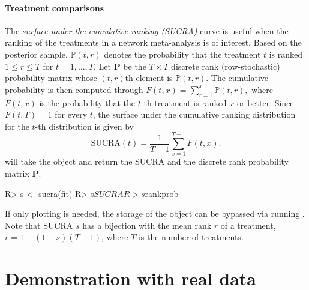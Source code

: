 \paragraph{Treatment comparisons}\label{subsec:treatment-comp} The \emph{surface under the cumulative ranking (SUCRA)} curve is useful when the ranking of the treatments in a network meta-analysis is of interest. Based on the
posterior sample, $\mathbb{P}(t,r)$ denotes the probability that the treatment $t$ is ranked $1\leq r \leq T$ for $t=1,\ldots,T$. Let $\mathbf{P}$ be the $T\times
T$ discrete rank (row-stochastic) probability matrix whose $(t,r)$th element is $\mathbb{P}(t,r)$. The cumulative probability is then computed through \(F(t,x) = \sum_{r=1}^x \mathbb{P}(t,r),\)
where $F(t,x)$ is the probability that the $t$-th treatment is ranked $x$ or better. Since $F(t,T)=1$ for every $t$, the surface under
the cumulative ranking distribution for the $t$-th distribution is given by
\[
  \mathrm{SUCRA}(t) = \dfrac{1}{T-1}\sum_{x=1}^{T-1}F(t,x).
\]
 will take the  object and return the SUCRA and the discrete rank probability matrix $\mathbf{P}$.
\begin{example}
R> s <- sucra(fit)
R> s$SUCRA
R> s$rankprob
\end{example}
If only plotting is needed, the storage of the  object can be bypassed via running . Note
that SUCRA $s$ has a bijection with the mean rank $r$ of a treatment, $r = 1 + (1-s)(T-1)$, where $T$ is the number of treatments.


\section{Demonstration with real data}\label{sec:metapack-benchmark}

